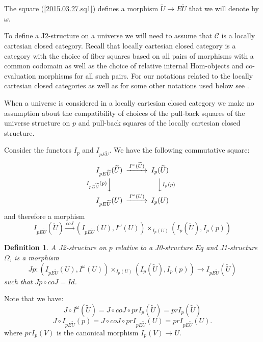 \documentclass[12pt]{article}
\newenvironment{eq}{\begin{equation}}{\end{equation}}
\newtheorem{definition}[proposition]{Definition}
\newcommand{\llabel}[1]{\label{#1}}
\newcommand{\sr}{\rightarrow}
\newcommand{\lr}{\longrightarrow}
\newcommand{\wt}{\widetilde}
\begin{document}
The square (\ref{2015.03.27.sq1}) defines a morphism $\wt{U}\sr E\wt{U}$ that we will denote by $\omega$. 



To define a J2-structure on a universe we will need to assume that $\mathcal C$ is a locally cartesian closed category.  Recall that locally cartesian closed category is a category with the choice of fiber squares based on all pairs of morphisms with a common codomain as well as the choice of relative internal Hom-objects and co-evaluation morphisms for all such pairs. For our notations related to the locally cartesian closed categories as well as for some other notations used below see \cite{fromunivwithPi}. 

When a universe is considered in a locally cartesian closed category we make no assumption about the compatibility of choices of the pull-back squares of the universe structure on $p$ and pull-back squares of the locally cartesian closed structure. 

Consider the functors $I_{p}$ and $I_{pE\wt{U}}$. We have the following commutative square:
%
\begin{eq}\llabel{2010.sq1}
\begin{CD}
I_{pE\wt{U}}(\wt{U}) @>I^{\omega}(\wt{U})>> I_p(\wt{U})\\
@VI_{pE\wt{U}}(p)VV @VVI_p(p)V\\
I_{pE\wt{U}}(U) @>I^{\omega}(U)>> I_p(U)
\end{CD}
\end{eq}
%
and therefore a morphism
%
$$I_{pE\wt{U}}(\wt{U}) \stackrel{coJ}{\lr}
(I_{pE\wt{U}}(U), I^{\omega}(U)) \times_{I_p(U)} (I_p(\wt{U}), I_p(p))
$$
%
\begin{definition}
\llabel{2015.03.27.def6}
A J2-structure on $p$ relative to a J0-structure $Eq$ and J1-structure $\Omega$, is a morphism 
%
$$
Jp:( I_{pE\wt{U}}(U), I^{\omega}(U))\times_{I_p(U)} (I_p(\wt{U}), I_p(p))\sr I_{pE\wt{U}}(\wt{U}) $$
%
such that $Jp\circ coJ = Id$.
\end{definition}
%
Note that we have:
%
\begin{eq}
\llabel{2015.04.04.eq1}
J\circ I^{\omega}(\wt{U})=J\circ coJ\circ prI_p(\wt{U})=prI_{p}(\wt{U})
\end{eq}
%
\begin{eq}
\llabel{2015.04.04.eq2}
J\circ I_{pE\wt{U}}(p)=J\circ coJ\circ prI_{pE\wt{U}}(U)=prI_{pE\wt{U}}(U).
\end{eq}
%
where $prI_p(V)$ is the canonical morphism $I_p(V)\sr U$.
\end{document}
